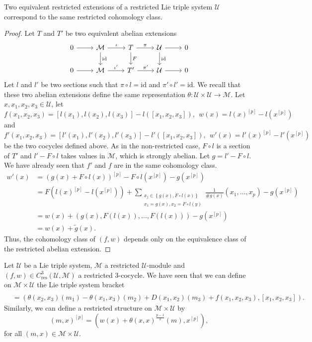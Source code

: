 \documentclass[11pt, twoside]{article}
\begin{document}
\begin{prop}
    Two equivalent restricted extensions of a restricted Lie triple system $\mathcal{U}$ correspond to the same restricted cohomology class.
\end{prop}

\begin{proof}
Let $T$ and $T'$ be two equivalent abelian extensions \[\begin{tikzcd}
	0 & \mathcal{M} & T & {\mathcal{U}} & 0 \\
	0 & \mathcal{M} & {T'} & {\mathcal{U}} & 0
	\arrow[from=1-1, to=1-2]
	\arrow["\iota", from=1-2, to=1-3]
	\arrow["{\mathrm{id}}", from=1-2, to=2-2]
	\arrow["\pi", from=1-3, to=1-4]
	\arrow["F", from=1-3, to=2-3]
	\arrow[from=1-4, to=1-5]
	\arrow["{\mathrm{id}}", from=1-4, to=2-4]
	\arrow[from=2-1, to=2-2]
	\arrow["{\iota'}", from=2-2, to=2-3]
	\arrow["{\pi'}", from=2-3, to=2-4]
	\arrow[from=2-4, to=2-5]
\end{tikzcd}\] Let $l$ and $l'$ be two sections such that $\pi\circ l=\mathrm{id} $ and $\pi'\circ l'=\mathrm{id} $. We recall that these two abelian extensions define the same representation $\theta:\mathcal{U}\times \mathcal{U}\to \mathcal{M}$. Let $x,x_1,x_2,x_3\in \mathcal{U}$, let $$f(x_1,x_2,x_3)=[l(x_1),l(x_2),l(x_3)]-l([x_1,x_2,x_3]) ,\ \ w(x)= l(x)^{[p]}-l(x^{[p]}) $$and $$f'(x_1,x_2,x_3)= [l'(x_1),l'(x_2),l'(x_3)]-l'([x_1,x_2,x_3]), \ \ w'(x)=l'(x)^{[p]}-l'(x^{[p]}) $$ be the two cocycles defined above. As in the non-restricted case, $F\circ l $ is a section of $T'$ and $l'-F\circ l  $ takes values in $\mathcal{M}$, which is strongly abelian. Let $g=l'-F\circ l$. We have already seen that $f' $ and $f$ are in the same cohomology class. \begin{align*}
    w'(x) &=  (g(x)+F\circ l(x))^{[p]} - F\circ l(x^{[p]})- g(x^{[p]})\\ &= F( l(x)^{[p]}- l(x^{[p]}))+ \sum_{\substack{x_j\in \left\{g(x),F\circ l(x) \right\}\\x_1=g(x),x_2=F\circ l(y)}}\frac{1}{\#g(x)} (x_1,\ldots,x_p)  -g(x^{[p]}) \\ &= w(x) +(g(x),F(l(x)),\ldots,F(l(x))) - g(x^{[p]}) \\ &= w(x) + \tilde{g}(x).
\end{align*} Thus, the cohomology class of $(f,w) $ depends only on the equivalence class of the restricted abelian extension. 
\end{proof}

Let $\mathcal{U} $ be a Lie triple system, $\mathcal{M} $ a restricted $\mathcal{U} $-module and $(f,w)\in C^3_\mathrm{res}(\mathcal{U},\mathcal{M}) $ a restricted $3$-cocycle. We have seen that we can define on $\mathcal{M}\times \mathcal{U} $ the Lie triple system bracket \begin{align*}
    [(m_1,x_1)&,(m_2,x_2),(m_3,x_3)] \\ &= (\theta(x_2,x_3)(m_1)- \theta(x_1,x_3)(m_2)+D(x_1,x_2)(m_3)+f(x_1,x_2,x_3),[x_1,x_2,x_3]). 
\end{align*} Similarly, we can define a restricted structure on $\mathcal{M}\times \mathcal{U} $ by $$(m,x)^{[p]}= (w(x)+\theta(x,x)^{\frac{p-1}{2}}(m),x^{[p]}), $$ for all $(m,x)\in \mathcal{M}\times \mathcal{U}$.
\end{document}
